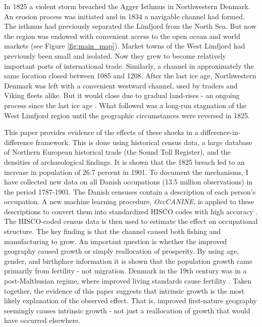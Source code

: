 \documentclass[11pt]{article}
\begin{document}
In 1825 a violent storm breached the Agger Isthmus in Northwestern Denmark. An erosion process was initiated and in 1834 a navigable channel had formed. The isthmus had previously separated the Limfjord from the North Sea. But now the region was endowed with convenient access to the open ocean and world markets (see Figure \ref{fig:main_map}). Market towns of the West Limfjord had previously been small and isolated. Now they grew to become relatively important ports of international trade. Similarly, a channel in approximately the same location closed between 1085 and 1208. After the last ice age, Northwestern Denmark was left with a convenient westward channel, used by traders and Viking fleets alike. But it would close due to gradual land-rises - an ongoing process since the last ice age \citep{Christensen2004}. What followed was a long-run stagnation of the West Limfjord region until the geographic circumstances were reversed in 1825.

This paper provides evidence of the effects of these shocks in a difference-in-difference framework. This is done using historical census data, a large database of Northern European historical trade (the Sound Toll Register), and the densities of archaeological findings. It is shown that the 1825 breach led to an increase in population of 26.7 percent in 1901. To document the mechanisms, I have collected new data on all Danish occupations (13.5 million observations) in the period 1787-1901. The Danish censuses contain a description of each person's occupation. A new machine learning procedure, \textit{OccCANINE}, is applied to these descriptions to convert them into standardized HISCO codes with high accuracy \citep{leeuwen2002hisco, dahl2024breaking}. The HISCO-coded census data is then used to estimate the effect on occupational structure. The key finding is that the channel caused both fishing and manufacturing to grow. An important question is whether the improved geography caused growth or simply reallocation of prosperity. By using age, gender, and birthplace information it is shown that the population growth came primarily from fertility - not migration. Denmark in the 19th century was in a post-Malthusian regime, where improved living standards cause fertility \citep{Jensen2022, Galor2011}. Taken together, the evidence of this paper suggests that intrinsic growth is the most likely explanation of the observed effect. That is, improved first-nature geography seemingly causes intrinsic growth - not just a reallocation of growth that would have occurred elsewhere.
\end{document}
